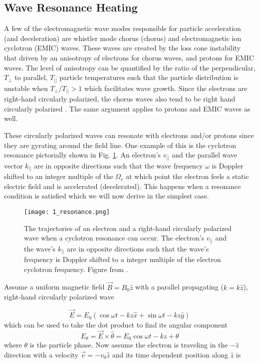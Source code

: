 \subsection{Wave Resonance Heating}\label{Intro:wave_heating}
A few of the electromagnetic wave modes responsible for particle acceleration (and deceleration) are whistler mode chorus (chorus) and electromagnetic ion cyclotron (EMIC) waves. These waves are created by the loss cone instability that driven by an anisotropy of electrons for chorus waves, and protons for EMIC waves. The level of anisotropy can be quantified by the ratio of the perpendicular, $T_\perp$ to parallel, $T_{||}$ particle temperatures such that the particle distribution is unstable when $T_\perp/T_{||} > 1$ which facilitates wave growth. Since the electrons are right-hand circularly polarized, the chorus waves also tend to be right hand circularly polarized \citep{Tsurutani1997}. The same argument applies to protons and EMIC waves as well. 

These circularly polarized waves can resonate with electrons and/or protons since they are gyrating around the field line. One example of this is the cyclotron resonance pictorially shown in Fig. \ref{Intro:resonance}. An electron's $v_{||}$ and the parallel wave vector $k_{||}$ are in opposite directions such that the wave frequency $\omega$ is Doppler shifted to an integer multiple of the $\Omega_e$ at which point the electron feels a static electric field and is accelerated (decelerated). This happens when a resonance condition is satisfied which we will now derive in the simplest case.

\begin{figure}
\texttt{[image: 1\_resonance.png]}
\caption{The trajectories of an electron and a right-hand circularly polarized wave when a cyclotron resonance can occur. The electron's $v_{||}$ and the wave's $k_{||}$ are in opposite directions such that the wave's frequency is Doppler shifted to a integer multiple of the electron cyclotron frequency. Figure from \citep{Tsurutani1997}.}
\label{Intro:resonance}
\end{figure}

Assume a uniform magnetic field $\vec{B} = B_0 \hat{z}$ with a parallel propagating ($k = k\hat{z}$), right-hand circularly polarized wave

\begin{equation}
\vec{E} = E_0 (\cos{\omega t - kz}\hat{x} + \sin{\omega t - kz}\hat{y}) 
\end{equation} which can be used to take the dot product to find its angular component
\begin{equation}
E_\theta = \vec{E} \times \hat{\theta} = E_0 \cos{\omega t - kz + \theta}
\end{equation} where $\theta$ is the particle phase. Now assume the electron is traveling in the $-\hat{z}$ direction with a velocity $\vec{v} = -v_0 \hat{z}$ and its time dependent position along $\hat{z}$ is

